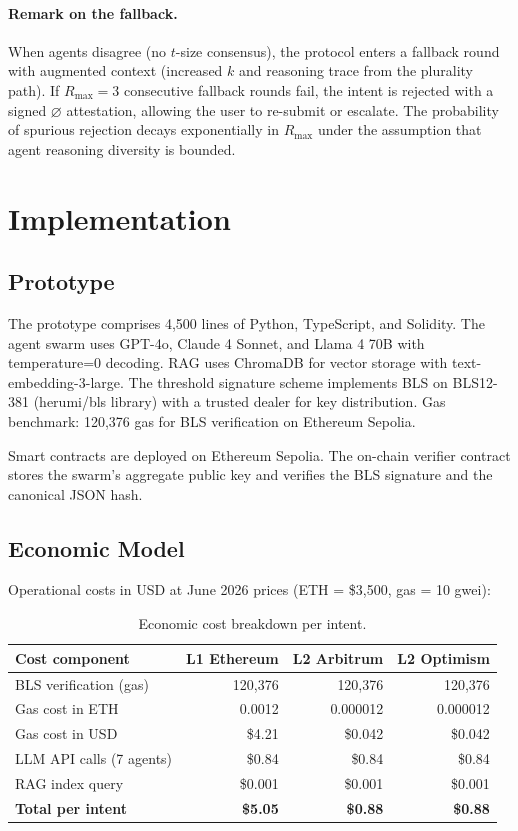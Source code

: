 \documentclass[11pt]{article}
\begin{document}
\paragraph{Remark on the fallback.} When agents disagree (no $t$-size consensus), the protocol enters a fallback round with augmented context (increased $k$ and reasoning trace from the plurality path). If $R_{\max}=3$ consecutive fallback rounds fail, the intent is rejected with a signed $\varnothing$ attestation, allowing the user to re-submit or escalate. The probability of spurious rejection decays exponentially in $R_{\max}$ under the assumption that agent reasoning diversity is bounded.

\section{Implementation}
\label{sec:impl}

\subsection{Prototype}

The prototype comprises 4,500 lines of Python, TypeScript, and Solidity. The agent swarm uses GPT-4o, Claude 4 Sonnet, and Llama 4 70B with temperature=0 decoding. RAG uses ChromaDB for vector storage with text-embedding-3-large. The threshold signature scheme implements BLS on BLS12-381 (herumi/bls library) with a trusted dealer for key distribution. Gas benchmark: 120,376 gas for BLS verification on Ethereum Sepolia.

Smart contracts are deployed on Ethereum Sepolia. The on-chain verifier contract stores the swarm's aggregate public key and verifies the BLS signature and the canonical JSON hash.

\subsection{Economic Model}

Operational costs in USD at June 2026 prices (ETH = \$3,500, gas = 10 gwei):

\begin{table}[t]
\centering
\caption{Economic cost breakdown per intent.}
\label{tab:costs}
\begin{tabular}{lrrr}
\toprule
\textbf{Cost component} & \textbf{L1 Ethereum} & \textbf{L2 Arbitrum} & \textbf{L2 Optimism} \\
\midrule
BLS verification (gas) & 120,376 & 120,376 & 120,376 \\
Gas cost in ETH & 0.0012 & 0.000012 & 0.000012 \\
Gas cost in USD & \$4.21 & \$0.042 & \$0.042 \\
LLM API calls (7 agents) & \$0.84 & \$0.84 & \$0.84 \\
RAG index query & \$0.001 & \$0.001 & \$0.001 \\
\textbf{Total per intent} & \textbf{\$5.05} & \textbf{\$0.88} & \textbf{\$0.88} \\
\bottomrule
\end{tabular}
\end{table}
\end{document}
